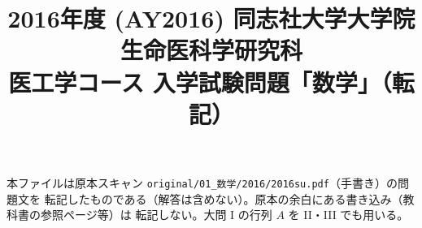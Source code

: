 \documentclass[11pt,a4paper]{article}
\title{2016年度 (AY2016) 同志社大学大学院 生命医科学研究科\\
医工学コース 入学試験問題「数学」（転記）}
\author{}
\date{}
\begin{document}
\maketitle
\vspace{-3em}

\begin{rem}
本ファイルは原本スキャン \texttt{original/01\_数学/2016/2016su.pdf}（手書き）の問題文を
転記したものである（解答は含めない）。原本の余白にある書き込み（教科書の参照ページ等）は
転記しない。大問 I の行列 $A$ を II・III でも用いる。
\end{rem}

\bigskip

\bigskip

\bigskip

\bigskip

\bigskip

\bigskip

\bigskip

\end{document}
